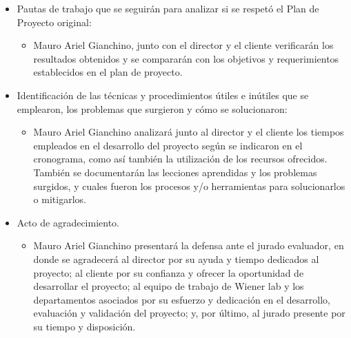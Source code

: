 \documentclass[
11pt, %
]{charter}
\begin{document}
\begin{itemize}
	\item Pautas de trabajo que se seguirán para analizar si se respetó el Plan de Proyecto original:
	\begin{itemize}
		\item Mauro Ariel Gianchino, junto con el director y el cliente verificarán los resultados obtenidos y se compararán con los objetivos y requerimientos establecidos en el plan de proyecto.
	\end{itemize}
		\item Identificación de las técnicas y procedimientos útiles e inútiles que se emplearon, los problemas que surgieron y cómo se solucionaron:
	\begin{itemize}
		\item Mauro Ariel Gianchino analizará junto al director y el cliente los tiempos empleados en el desarrollo del proyecto según se indicaron en el cronograma, como así también la utilización de los recursos ofrecidos. También se documentarán las lecciones aprendidas y los problemas surgidos, y cuales fueron los procesos y/o herramientas para solucionarlos o mitigarlos.
	\end{itemize}
		\item Acto de agradecimiento.
	\begin{itemize}
		\item Mauro Ariel Gianchino presentará la defensa ante el jurado evaluador, en donde se agradecerá al director por su ayuda y tiempo dedicados al proyecto; al cliente por su confianza y ofrecer la oportunidad de desarrollar el proyecto; al equipo de trabajo de Wiener lab y los departamentos asociados por su esfuerzo y dedicación en el desarrollo, evaluación y validación del proyecto; y, por último, al jurado presente por su tiempo y disposición.
	\end{itemize}

\end{itemize}
\end{document}
